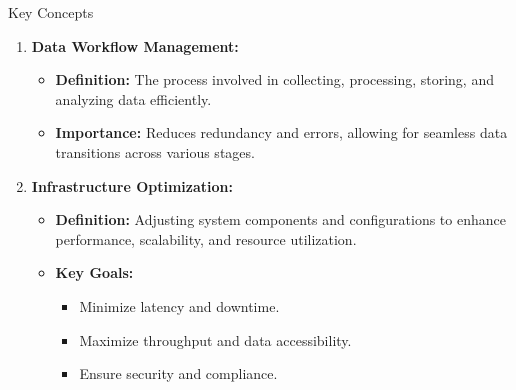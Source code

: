 \documentclass[aspectratio=169]{beamer}
\begin{document}
\begin{frame}[fragile]{Key Concepts}
  \begin{enumerate}
    \item \textbf{Data Workflow Management:}
      \begin{itemize}
        \item \textbf{Definition:} The process involved in collecting, processing, storing, and analyzing data efficiently.
        \item \textbf{Importance:} Reduces redundancy and errors, allowing for seamless data transitions across various stages.
      \end{itemize}

    \item \textbf{Infrastructure Optimization:}
      \begin{itemize}
        \item \textbf{Definition:} Adjusting system components and configurations to enhance performance, scalability, and resource utilization.
        \item \textbf{Key Goals:}
          \begin{itemize}
            \item Minimize latency and downtime.
            \item Maximize throughput and data accessibility.
            \item Ensure security and compliance.
          \end{itemize}
      \end{itemize}
  \end{enumerate}
\end{frame}
\end{document}
